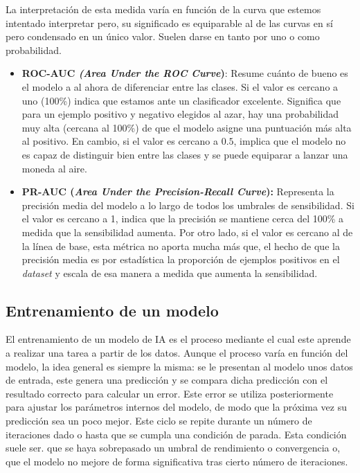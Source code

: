 \begin{itemize}
	La interpretación de esta medida varía en función de la curva que estemos intentado interpretar pero, su significado es equiparable al de las curvas en sí pero condensado en un único valor. Suelen darse en tanto por uno o como probabilidad.
	
	\begin{itemize}
		\item \textbf{ROC-AUC \textit{(Area Under the ROC Curve})}: Resume cuánto de bueno es el modelo a al ahora de diferenciar entre las clases. Si el valor es cercano a uno (100\%) indica que estamos ante un clasificador excelente. Significa que para un ejemplo positivo y negativo elegidos al azar, hay una probabilidad muy alta (cercana al 100\%) de que el modelo asigne una puntuación más alta al positivo. En cambio, si el valor es cercano a $0.5$, implica que el modelo no es capaz de distinguir bien entre las clases y se puede equiparar a lanzar una moneda al aire.
		
		\item \textbf{PR-AUC (\textit{Area Under the Precision-Recall Curve}):} Representa la precisión media del modelo a lo largo de todos los umbrales de sensibilidad. Si el valor es cercano a 1, indica que la precisión se mantiene cerca del 100\% a medida que la sensibilidad aumenta. Por otro lado, si el valor es cercano al de la línea de base, esta métrica no aporta mucha más que, el hecho de que la precisión media es por estadística la proporción de ejemplos positivos en el \textit{dataset} y escala de esa manera a medida que aumenta la sensibilidad.
	\end{itemize}
\end{itemize}

\subsection{Entrenamiento de un modelo}

El entrenamiento de un modelo de IA es el proceso mediante el cual este aprende a realizar una tarea a partir de los datos. Aunque el proceso varía en función del modelo, la idea general es siempre la misma: se le presentan al modelo unos datos de entrada, este genera una predicción y se compara dicha predicción con el resultado correcto para calcular un error. Este error se utiliza posteriormente para ajustar los parámetros internos del modelo, de modo que la próxima vez su predicción sea un poco mejor. Este ciclo se repite durante un número de iteraciones dado o hasta que se cumpla una condición de parada. Esta condición suele ser. que se haya sobrepasado un umbral de rendimiento o convergencia o, que el modelo no mejore de forma significativa tras cierto número de iteraciones.

